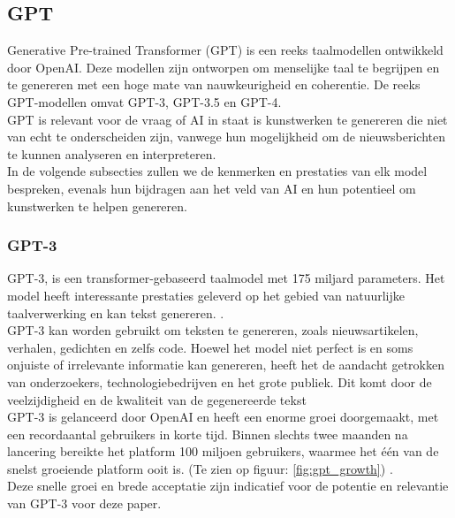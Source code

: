 \subsection{GPT}
\label{sub:GPT}
Generative Pre-trained Transformer (GPT) is een reeks taalmodellen ontwikkeld door OpenAI. Deze modellen zijn ontworpen om menselijke taal te begrijpen en te genereren met een hoge mate van nauwkeurigheid en coherentie. De reeks GPT-modellen omvat GPT-3, GPT-3.5 en GPT-4. \\

GPT is relevant voor de vraag of AI in staat is kunstwerken te genereren die niet van echt te onderscheiden zijn, vanwege hun mogelijkheid om de nieuwsberichten te kunnen analyseren en interpreteren. \\

In de volgende subsecties zullen we de kenmerken en prestaties van elk model bespreken, evenals hun bijdragen aan het veld van AI en hun potentieel om kunstwerken te helpen genereren. \\

\subsubsection{GPT-3}
GPT-3, is een transformer-gebaseerd taalmodel met 175 miljard parameters. Het model heeft interessante prestaties geleverd op het gebied van natuurlijke taalverwerking en kan tekst genereren. \autocite{nytimes_gpt3}. \\

GPT-3 kan worden gebruikt om teksten te genereren, zoals nieuwsartikelen, verhalen, gedichten en zelfs code. Hoewel het model niet perfect is en soms onjuiste of irrelevante informatie kan genereren, heeft het de aandacht getrokken van onderzoekers, technologiebedrijven en het grote publiek. Dit komt door de veelzijdigheid en de kwaliteit van de gegenereerde tekst \autocite{wiki_gpt3} \\

GPT-3 is gelanceerd door OpenAI en heeft een enorme groei doorgemaakt, met een recordaantal gebruikers in korte tijd. Binnen slechts twee maanden na lancering bereikte het platform 100 miljoen gebruikers, waarmee het één van de snelst groeiende platform ooit is. (Te zien op figuur: \ref{fig:gpt_growth}) \autocite{reuters_chatgpt}. \\

Deze snelle groei en brede acceptatie zijn indicatief voor de potentie en relevantie van GPT-3 voor deze paper.\\


